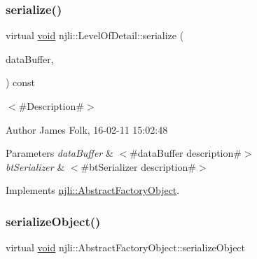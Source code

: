 \mbox{\label{classnjli_1_1_level_of_detail_adf8ccbfc2065af4e646888dab0402855}} 
\subsubsection{\texorpdfstring{serialize()}{serialize()}}
{\footnotesize\ttfamily virtual \mbox{\hyperlink{_thread_8h_af1e856da2e658414cb2456cb6f7ebc66}{void}} njli\+::\+Level\+Of\+Detail\+::serialize (\begin{DoxyParamCaption}\item[{\mbox{\hyperlink{_thread_8h_af1e856da2e658414cb2456cb6f7ebc66}{void}} $\ast$}]{data\+Buffer,  }\item[{bt\+Serializer $\ast$}]{ }\end{DoxyParamCaption}) const\hspace{0.3cm}{\ttfamily [virtual]}}



$<$\#\+Description\#$>$ 

\begin{DoxyAuthor}{Author}
James Folk, 16-\/02-\/11 15\+:02\+:48
\end{DoxyAuthor}

\begin{DoxyParams}{Parameters}
{\em data\+Buffer} & $<$\#data\+Buffer description\#$>$ \\
\hline
{\em bt\+Serializer} & $<$\#bt\+Serializer description\#$>$ \\
\hline
\end{DoxyParams}


Implements \mbox{\hyperlink{classnjli_1_1_abstract_factory_object_aad2fbe86fb3bdecf02918a96b9c57976}{njli\+::\+Abstract\+Factory\+Object}}.

\mbox{\label{classnjli_1_1_level_of_detail_a4fc4bcd9d1930911474210c047372fc0}} 
\subsubsection{\texorpdfstring{serialize\+Object()}{serializeObject()}}
{\footnotesize\ttfamily virtual \mbox{\hyperlink{_thread_8h_af1e856da2e658414cb2456cb6f7ebc66}{void}} njli\+::\+Abstract\+Factory\+Object\+::serialize\+Object}

